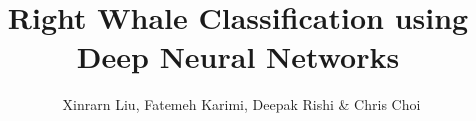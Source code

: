 \documentclass[11pt]{article}
\begin{document}
\title{Right Whale Classification using Deep Neural Networks}
\author{\
    Xinrarn Liu,
    Fatemeh Karimi,
    Deepak Rishi \&
    Chris Choi
}











\end{document}
